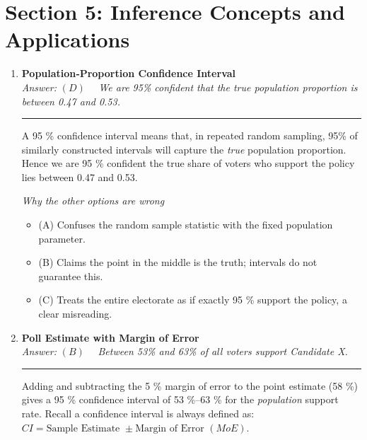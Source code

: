 \documentclass[12pt]{article}
\begin{document}
\section*{Section 5: Inference Concepts and Applications}

\begin{enumerate}[label=5.\arabic*]
\item \textbf{Population‐Proportion Confidence Interval}\\[2pt]


\textit{Answer:}\; $\boxed{(D)} \quad$ \emph{We are 95\% confident that the true population proportion is between 0.47 and 0.53.} \newline \noindent\hspace*{0.01cm}\rule{\linewidth}{0.1pt}

A 95 \% confidence interval means that, in repeated random sampling, 95\% of similarly constructed intervals will capture the \emph{true} population proportion.
Hence we are 95 \% confident the true share of voters who support the policy lies between 0.47 and 0.53.

\smallskip
\emph{Why the other options are wrong}
\begin{itemize}
  \item (A) Confuses the random sample statistic with the fixed population parameter.
  \item (B) Claims the point in the middle is the truth; intervals do not guarantee this.
  \item (C) Treats the entire electorate as if exactly 95 \% support the policy, a clear misreading.
\end{itemize}

\item \textbf{Poll Estimate with Margin of Error}\\[2pt]

\textit{Answer:}\; $\boxed{(B)} \quad$ \emph{Between 53\% and 63\% of all voters support Candidate X.}  \newline \noindent\hspace*{0.01cm}\rule{\linewidth}{0.1pt}

Adding and subtracting the 5 \% margin of error to the point estimate (58 \%) gives a 95 \% confidence interval of 53 \%–63 \% for the \emph{population} support rate. Recall a confidence interval is always defined as: $CI = \text{Sample Estimate } \pm \text{Margin of Error }(MoE)$.


\end{enumerate}
\end{document}

